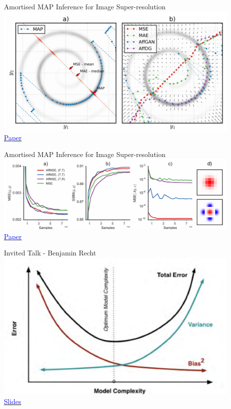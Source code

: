 \documentclass[]{beamer}
\begin{document}
\begin{frame}{Amortised MAP Inference for Image Super-resolution}
\centering
\includegraphics[width=0.9\textwidth]{figures/sonderby-swiss-roll} \\
\href{https://openreview.net/forum?id=S1RP6GLle&noteId=S1RP6GLle}{\textcolor{blue}{Paper}}
\end{frame}

\begin{frame}{Amortised MAP Inference for Image Super-resolution}
\centering
\includegraphics[width=0.9\textwidth]{figures/sonderby-celeba} \\
\href{https://openreview.net/forum?id=S1RP6GLle&noteId=S1RP6GLle}{\textcolor{blue}{Paper}}
\end{frame}

\begin{frame}{Invited Talk - Benjamin Recht}
\centering
\includegraphics[width=0.9\textwidth]{figures/recht-bias-variance} \\
\href{http://iclr.cc/lib/exe/fetch.php?media=iclr2017:recht\_iclr2017.pdf}{\textcolor{blue}{Slides}}
\end{frame}
\end{document}
